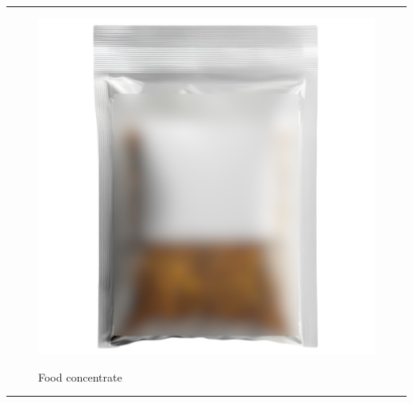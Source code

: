 \documentclass{article}
\begin{document}
    
        \par\noindent\rule{\textwidth}{0.4pt}
    \begin{figure}[H]
        \centering
        \begin{minipage}{0.25\textwidth}
            \centering
            \includegraphics[width=\textwidth]{../SurvivalItemImages/concentrate}
        \end{minipage}\hfill
        \begin{minipage}{0.7\textwidth}
            \centering
            \Large Food concentrate
        \end{minipage}
    \end{figure}
    \vspace{-0.8em}
    \noindent\rule{\textwidth}{0.4pt}
            
\end{document}
